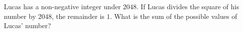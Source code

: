 Lucas has a non-negative integer under $2048$. If Lucas divides the square of his number by $2048$, the remainder is $1$. What is the sum of the possible values of Lucas' number?
